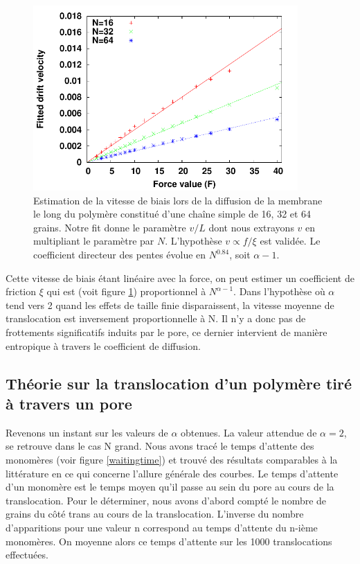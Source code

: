 \begin{figure}[H]
\begin{center}
\includegraphics[width=0.9\textwidth]{retestfrictioncoeffsimplepolrescaled.pdf}


\caption[Friction et translocation, polymère simple]{Estimation de la vitesse de biais lors de la diffusion de la membrane le long du polymère constitué d'une chaîne simple de 16, 32 et 64 grains. Notre fit donne le paramètre $v/L$ dont nous extrayons $v$ en multipliant le paramètre par $N$. L'hypothèse $v \propto f/\xi $ est validée. Le coefficient directeur des pentes évolue en $N^{0.84}$, soit $\alpha-1$.}
\label{frictionpolsimple}
\end{center}
\end{figure}


Cette vitesse de biais étant linéaire avec la force, on peut estimer un coefficient de friction $\xi$ qui est (voit figure \ref{frictionpolsimple}) proportionnel à $N^{\alpha-1}$. Dans l'hypothèse où $\alpha$ tend vers 2 quand les effets de taille finie disparaissent, la vitesse moyenne de translocation est inversement proportionnelle à N. Il n'y a donc pas de frottements significatifs induits par le pore, ce dernier intervient de manière entropique à travers le coefficient de diffusion.
\newpage

\subsection{Théorie sur la translocation d'un polymère tiré à travers un pore}



Revenons un instant sur les valeurs de $\alpha$ obtenues. La valeur attendue de $\alpha=2$, se retrouve dans le cas N grand. Nous avons tracé le temps d'attente des monomères (voir figure \ref{waitingtime}) et trouvé des résultats comparables à la littérature \cite{Huopaniemi2007} en ce qui concerne l'allure générale des courbes. Le temps d'attente d'un monomère est le temps moyen qu'il passe au sein du pore au cours de la translocation. Pour le déterminer, nous avons d'abord compté le nombre de grains du côté trans au cours de la translocation. L'inverse du nombre d'apparitions pour une valeur n correspond au temps d'attente du n-ième monomères. On moyenne alors ce temps d'attente sur les 1000 translocations effectuées.

